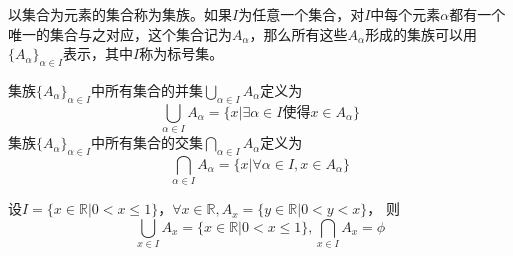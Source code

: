   \begin{Def}  
    以集合为元素的集合称为集族。如果$I$为任意一个集合，对$I$中每个元素$\alpha$都有一个唯一的集合与之对应，这个集合记为$A_{\alpha}$，那么所有这些$A_{\alpha}$形成的集族可以用$\{A_{\alpha}\}_{\alpha \in I}$表示，其中$I$称为标号集。
  \end{Def}
  \begin{Def}
    集族$\{A_{\alpha}\}_{\alpha \in I}$中所有集合的并集$\bigcup_{\alpha \in I}A_{\alpha}$定义为
\[ \bigcup_{\alpha \in I}A_{\alpha} = \{x|\exists \alpha \in I \text{使得} x \in A_{\alpha}\}\]
    集族$\{A_{\alpha}\}_{\alpha \in I}$中所有集合的交集$\bigcap_{\alpha \in I}A_{\alpha}$定义为
\[ \bigcap_{\alpha \in I}A_{\alpha} = \{x|\forall \alpha \in I, x \in A_{\alpha}\}\]
  \end{Def}

  \begin{Example}
    设$I=\{x \in \mathbb{R} | 0 < x \leq 1\}$，$\forall x \in \mathbb{R}, A_x=\{y\in \mathbb{R}|0 < y < x\}$，
    则
    \begin{equation*}
      \bigcup_{x\in I}A_x=\{x \in \mathbb{R} | 0 < x \leq 1\},
      \bigcap_{x\in I}A_x=\phi      
    \end{equation*}
  \end{Example}

